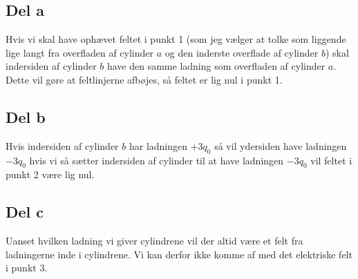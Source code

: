\subsection{Del a} %
\label{sub:del_a}
Hvis vi skal have ophævet feltet i punkt 1 (som jeg vælger at tolke som liggende lige langt fra overfladen af cylinder $a$ og den inderste overflade af cylinder $b$) skal indersiden af cylinder $b$ have den samme ladning som overfladen af cylinder $a$. Dette vil gøre at feltlinjerne afbøjes, så feltet er lig nul i punkt 1. 

\subsection{Del b} %
\label{sub:del_b}
Hvis indersiden af cylinder $b$ har ladningen $+3q_0$ så vil ydersiden have ladningen $-3q_0$ hvis vi så sætter indersiden af cylinder til at have ladningen $-3q_0$ vil feltet i punkt 2 være lig nul.

\subsection{Del c} %
\label{sub:del_c}
Uanset hvilken ladning vi giver cylindrene vil der altid være et felt fra ladningerne inde i cylindrene. Vi kan derfor ikke komme af med det elektriske felt i punkt 3.
